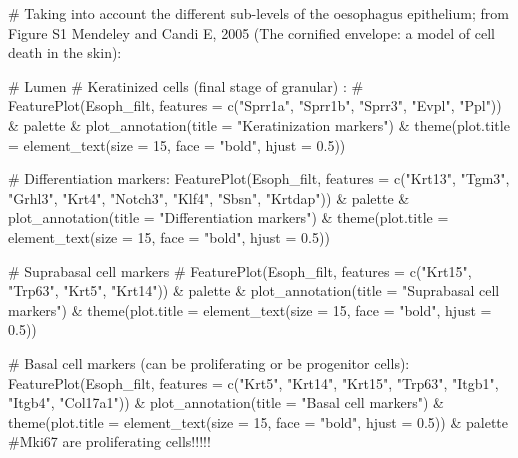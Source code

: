 \documentclass[
  letterpaper,
  DIV=11,
  numbers=noendperiod]{scrreprt}
\newenvironment{Shaded}{\begin{snugshade}}{\end{snugshade}}
\newcommand{\AttributeTok}[1]{\textcolor[rgb]{0.40,0.45,0.13}{#1}}
\newcommand{\CommentTok}[1]{\textcolor[rgb]{0.37,0.37,0.37}{#1}}
\newcommand{\DecValTok}[1]{\textcolor[rgb]{0.68,0.00,0.00}{#1}}
\newcommand{\FloatTok}[1]{\textcolor[rgb]{0.68,0.00,0.00}{#1}}
\newcommand{\FunctionTok}[1]{\textcolor[rgb]{0.28,0.35,0.67}{#1}}
\newcommand{\NormalTok}[1]{\textcolor[rgb]{0.00,0.23,0.31}{#1}}
\newcommand{\SpecialCharTok}[1]{\textcolor[rgb]{0.37,0.37,0.37}{#1}}
\newcommand{\StringTok}[1]{\textcolor[rgb]{0.13,0.47,0.30}{#1}}
\begin{document}
\begin{Shaded}
\begin{Highlighting}[]
\CommentTok{\# Taking into account the different sub{-}levels of the oesophagus epithelium; from Figure S1 Mendeley and Candi E, 2005 (The cornified envelope: a model of cell death in the skin):}

\CommentTok{\# Lumen}
\CommentTok{\# Keratinized cells (final stage of granular) :}
\CommentTok{\# FeaturePlot(Esoph\_filt, features = c("Sprr1a", "Sprr1b", "Sprr3", "Evpl", "Ppl")) \& palette \& plot\_annotation(title = "Keratinization markers") \& theme(plot.title = element\_text(size = 15, face = "bold", hjust = 0.5))}

\CommentTok{\# Differentiation markers:}
\FunctionTok{FeaturePlot}\NormalTok{(Esoph\_filt, }\AttributeTok{features =} \FunctionTok{c}\NormalTok{(}\StringTok{"Krt13"}\NormalTok{,  }\StringTok{"Tgm3"}\NormalTok{, }\StringTok{"Grhl3"}\NormalTok{, }\StringTok{"Krt4"}\NormalTok{, }\StringTok{"Notch3"}\NormalTok{, }\StringTok{"Klf4"}\NormalTok{, }\StringTok{"Sbsn"}\NormalTok{, }\StringTok{"Krtdap"}\NormalTok{)) }\SpecialCharTok{\&}\NormalTok{ palette }\SpecialCharTok{\&} \FunctionTok{plot\_annotation}\NormalTok{(}\AttributeTok{title =} \StringTok{"Differentiation markers"}\NormalTok{) }\SpecialCharTok{\&} \FunctionTok{theme}\NormalTok{(}\AttributeTok{plot.title =} \FunctionTok{element\_text}\NormalTok{(}\AttributeTok{size =} \DecValTok{15}\NormalTok{, }\AttributeTok{face =} \StringTok{"bold"}\NormalTok{, }\AttributeTok{hjust =} \FloatTok{0.5}\NormalTok{))}

\CommentTok{\# Suprabasal cell markers}
\CommentTok{\# FeaturePlot(Esoph\_filt, features = c("Krt15", "Trp63", "Krt5", "Krt14")) \& palette \& plot\_annotation(title = "Suprabasal cell markers") \& theme(plot.title = element\_text(size = 15, face = "bold", hjust = 0.5))}

\CommentTok{\# Basal cell markers (can be proliferating or be progenitor cells):}
\FunctionTok{FeaturePlot}\NormalTok{(Esoph\_filt, }\AttributeTok{features =} \FunctionTok{c}\NormalTok{(}\StringTok{"Krt5"}\NormalTok{, }\StringTok{"Krt14"}\NormalTok{, }\StringTok{"Krt15"}\NormalTok{, }\StringTok{"Trp63"}\NormalTok{, }\StringTok{"Itgb1"}\NormalTok{, }\StringTok{"Itgb4"}\NormalTok{, }\StringTok{"Col17a1"}\NormalTok{)) }\SpecialCharTok{\&} \FunctionTok{plot\_annotation}\NormalTok{(}\AttributeTok{title =} \StringTok{"Basal cell markers"}\NormalTok{) }\SpecialCharTok{\&}
  \FunctionTok{theme}\NormalTok{(}\AttributeTok{plot.title =} \FunctionTok{element\_text}\NormalTok{(}\AttributeTok{size =} \DecValTok{15}\NormalTok{, }\AttributeTok{face =} \StringTok{"bold"}\NormalTok{, }\AttributeTok{hjust =} \FloatTok{0.5}\NormalTok{)) }\SpecialCharTok{\&}\NormalTok{ palette }\CommentTok{\#Mki67 are proliferating cells!!!!!}


\end{Highlighting}
\end{Shaded}
\end{document}

